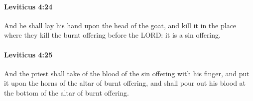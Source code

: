 		\paragraph{Leviticus 4:24} %
			\label{LEVITICUS-4-24}

			And he shall lay his hand upon the head of the goat, and kill it in the place where they kill the burnt offering before the LORD: it is a sin offering.


		\paragraph{Leviticus 4:25} %
			\label{LEVITICUS-4-25}

			And the priest shall take of the blood of the sin offering with his finger, and put it upon the horns of the altar of burnt offering, and shall pour out his blood at the bottom of the altar of burnt offering.

